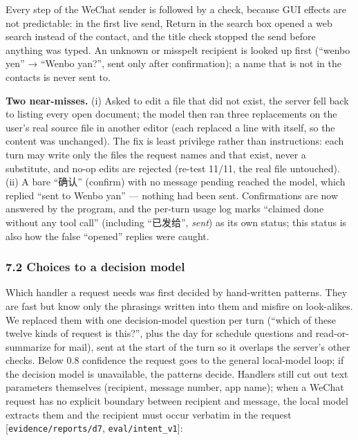 \documentclass[
  10pt,
]{article}
\begin{document}
Every step of the WeChat sender is followed by a check, because GUI
effects are not predictable: in the first live send, Return in the
search box opened a web search instead of the contact, and the title
check stopped the send before anything was typed. An unknown or misspelt
recipient is looked up first (``wenbo yen'' → ``Wenbo yan?'', sent only
after confirmation); a name that is not in the contacts is never sent
to.

\textbf{Two near-misses.} (i) Asked to edit a file that did not exist,
the server fell back to listing every open document; the model then ran
three replacements on the user's real source file in another editor
(each replaced a line with itself, so the content was unchanged). The
fix is least privilege rather than instructions: each turn may write
only the files the request names and that exist, never a substitute, and
no-op edits are rejected (re-test 11/11, the real file untouched). (ii)
A bare ``确认'' (confirm) with no message pending reached the model,
which replied ``sent to Wenbo yan'' --- nothing had been sent.
Confirmations are now answered by the program, and the per-turn usage
log marks ``claimed done without any tool call'' (including ``已发给'',
\emph{sent}) as its own status; this status is also how the false
``opened'' replies were caught.

\subsubsection{7.2 Choices to a decision
model}\label{choices-to-a-decision-model}

Which handler a request needs was first decided by hand-written
patterns. They are fast but know only the phrasings written into them
and misfire on look-alikes. We replaced them with one decision-model
question per turn (``which of these twelve kinds of request is this?'',
plus the day for schedule questions and read-or-summarize for mail),
sent at the start of the turn so it overlaps the server's other checks.
Below 0.8 confidence the request goes to the general local-model loop;
if the decision model is unavailable, the patterns decide. Handlers
still cut out text parameters themselves (recipient, message number, app
name); when a WeChat request has no explicit boundary between recipient
and message, the local model extracts them and the recipient must occur
verbatim in the request {[}\texttt{evidence/reports/d7},
\texttt{eval/intent\_v1}{]}:
\end{document}
